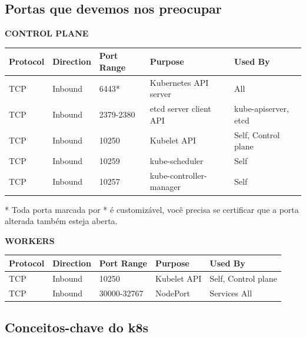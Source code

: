 \documentclass[12pt,a4paper]{article}
\begin{document}
\vspace{1em}

\subsection{Portas que devemos nos preocupar}
\label{sec:portas}

\textbf{CONTROL PLANE}

\begin{table}[h]
\centering
\begin{tabular}{lllll}
\toprule
\textbf{Protocol} & \textbf{Direction} & \textbf{Port Range} & \textbf{Purpose} & \textbf{Used By} \\
\midrule
TCP & Inbound & 6443* & Kubernetes API server & All \\
TCP & Inbound & 2379-2380 & etcd server client API & kube-apiserver, etcd \\
TCP & Inbound & 10250 & Kubelet API & Self, Control plane \\
TCP & Inbound & 10259 & kube-scheduler & Self \\
TCP & Inbound & 10257 & kube-controller-manager & Self \\
\bottomrule
\end{tabular}
\end{table}

* Toda porta marcada por * é customizável, você precisa se certificar que a porta alterada também esteja aberta.

\vspace{1em}

\textbf{WORKERS}

\begin{table}[h]
\centering
\begin{tabular}{lllll}
\toprule
\textbf{Protocol} & \textbf{Direction} & \textbf{Port Range} & \textbf{Purpose} & \textbf{Used By} \\
\midrule
TCP & Inbound & 10250 & Kubelet API & Self, Control plane \\
TCP & Inbound & 30000-32767 & NodePort & Services All \\
\bottomrule
\end{tabular}
\end{table}

\vspace{1em}

\subsection{Conceitos-chave do k8s}
\label{sec:conceitos}
\end{document}
